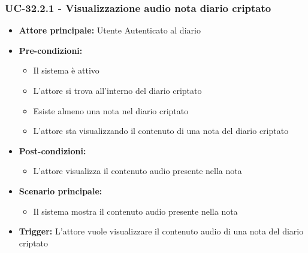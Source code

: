\documentclass[a4paper,12pt]{article}
\begin{document}
\subsubsection{UC-32.2.1 - Visualizzazione audio nota diario criptato} \label{subsec:UC-32.2.1}
\begin{itemize}
    \item \textbf{Attore principale:} Utente Autenticato al diario
    \item \textbf{Pre-condizioni:}
    \begin{itemize}
        \item Il sistema è attivo
        \item L'attore si trova all'interno del diario criptato
        \item Esiste almeno una nota nel diario criptato
        \item L'attore sta visualizzando il contenuto di una nota del diario criptato
    \end{itemize}
    \item \textbf{Post-condizioni:}
    \begin{itemize}
        \item L'attore visualizza il contenuto audio presente nella nota
    \end{itemize}
    \item \textbf{Scenario principale:}
    \begin{itemize}
        \item Il sistema mostra il contenuto audio presente nella nota 
    \end{itemize}
    \item \textbf{Trigger:} L'attore vuole visualizzare il contenuto audio di una nota del diario criptato
\end{itemize}
\end{document}

